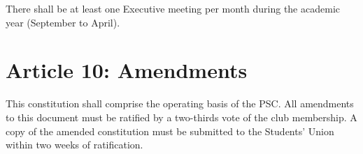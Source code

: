 \documentclass{article}
\begin{document}
There shall be at least one Executive meeting per month during the academic year (September to April).

\section{Article 10: Amendments}

This constitution shall comprise the operating basis of the PSC.
All amendments to this document must be ratified by a two-thirds vote of the club membership.  
A copy of the amended constitution must be submitted to the Students' Union within two weeks of ratification.   
\end{document}
